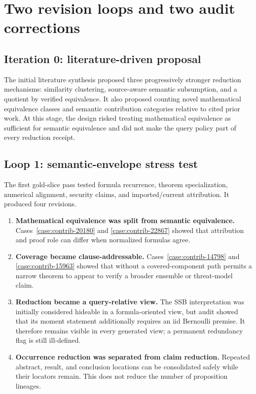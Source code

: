 \section{Two revision loops and two audit corrections}\label{sec:iteration}

\subsection{Iteration 0: literature-driven proposal}

The initial literature synthesis proposed three progressively stronger reduction mechanisms: similarity clustering, source-aware semantic subsumption, and a quotient by verified \MathClaim{} equivalence. It also proposed counting novel mathematical equivalence classes and semantic contribution categories relative to cited prior work. At this stage, the design risked treating mathematical equivalence as sufficient for semantic equivalence and did not make the query policy part of every reduction receipt.

\subsection{Loop 1: semantic-envelope stress test}

The first gold-slice pass tested formula recurrence, theorem specialization, numerical alignment, security claims, and imported/current attribution. It produced four revisions.

\begin{enumerate}
  \item \textbf{Mathematical equivalence was split from semantic equivalence.} Cases~\ref{case:contrib-20180} and \ref{case:contrib-22867} showed that attribution and proof role can differ when normalized formulas agree.
  \item \textbf{Coverage became clause-addressable.} Cases~\ref{case:contrib-14798} and \ref{case:contrib-15963} showed that  without a covered-component path permits a narrow theorem to appear to verify a broader ensemble or threat-model claim.
  \item \textbf{Reduction became a query-relative view.} The SSB interpretation was initially considered hideable in a formula-oriented view, but audit showed that its moment statement additionally requires an iid Bernoulli premise. It therefore remains visible in every generated view; a permanent redundancy flag is still ill-defined.
  \item \textbf{Occurrence reduction was separated from claim reduction.} Repeated abstract, result, and conclusion locations can be consolidated safely while their locators remain. This does not reduce the number of proposition lineages.
\end{enumerate}

